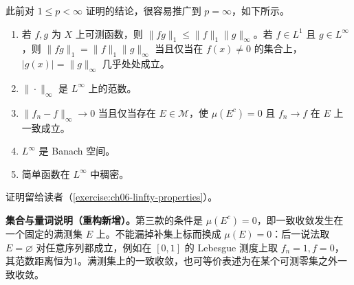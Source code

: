 \documentclass[../../main.tex]{subfiles}
\begin{document}
此前对 $1\leqslant p<\infty$ 证明的结论，很容易推广到 $p=\infty$，如下所示。
\begin{theorem}\label{theorem:ch06-linfty-properties}
\begin{enumerate}
\item\label{item:ch06-linfty-holder} 若 $f,g$ 为 $X$ 上可测函数，则 $\|fg\|_1\leqslant\|f\|_1\|g\|_\infty$。若 $f\in L^1$ 且 $g\in L^\infty$，则 $\|fg\|_1=\|f\|_1\|g\|_\infty$ 当且仅当在 $f(x)\ne0$ 的集合上，$|g(x)|=\|g\|_\infty$ 几乎处处成立。
\item\label{item:ch06-linfty-norm} $\|\cdot\|_\infty$ 是 $L^\infty$ 上的范数。
\item\label{item:ch06-linfty-uniform} $\|f_n-f\|_\infty\to0$ 当且仅当存在 $E\in\mathscr M$，使 $\mu(E^c)=0$ 且 $f_n\to f$ 在 $E$ 上一致成立。
\item\label{item:ch06-linfty-complete} $L^\infty$ 是 Banach 空间。
\item\label{item:ch06-linfty-simple-density} 简单函数在 $L^\infty$ 中稠密。
\end{enumerate}
\end{theorem}
证明留给读者（\cref{exercise:ch06-linfty-properties}）。
\begin{remark}\label{remark:ch06-linfty-uniform-scope}
\textbf{集合与量词说明（重构新增）。}第三款的条件是 $\mu(E^c)=0$，即一致收敛发生在一个固定的满测集 $E$ 上。不能漏掉补集上标而换成 $\mu(E)=0$：后一说法取 $E=\varnothing$ 对任意序列都成立，例如在 $[0,1]$ 的 Lebesgue 测度上取 $f_n=1,f=0$，其范数距离恒为1。满测集上的一致收敛，也可等价表述为在某个可测零集之外一致收敛。
\end{remark}
\end{document}
